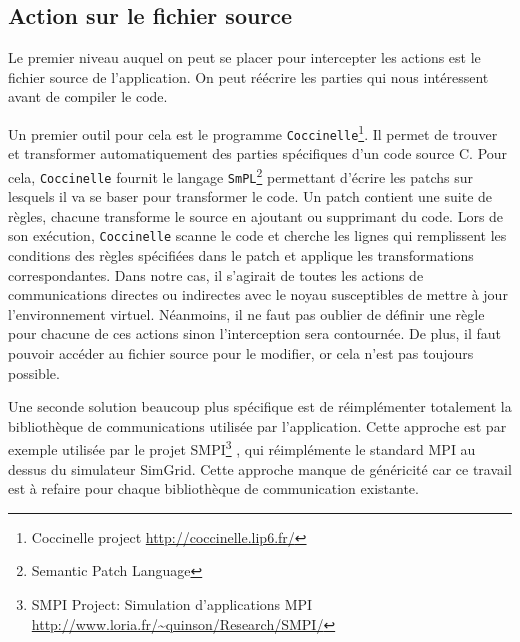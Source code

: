 \subsection{Action sur le fichier source}
\label{subsection:source}
Le premier niveau auquel on peut se placer pour intercepter les actions est le fichier source de l'application. On peut réécrire les parties qui nous intéressent avant de compiler le code.

Un premier outil pour cela est le programme \texttt{Coccinelle}\footnote{Coccinelle project \url{http://coccinelle.lip6.fr/}}. Il permet de trouver et transformer automatiquement des parties spécifiques d'un code source C. Pour cela, \texttt{Coccinelle} fournit le langage \texttt{SmPL}\footnote{Semantic Patch Language} permettant d'écrire les patchs sur lesquels il va se baser pour transformer le code. Un patch contient une suite de règles, chacune transforme le source en ajoutant ou supprimant du code. Lors de son exécution, \texttt{Coccinelle} scanne le code et cherche les lignes qui remplissent les conditions des règles spécifiées dans le patch et applique les transformations correspondantes. Dans notre cas, il s'agirait de toutes les actions de communications directes ou indirectes avec le noyau susceptibles de mettre à jour l'environnement virtuel. Néanmoins, il ne faut pas oublier de définir une règle pour chacune de ces actions sinon l'interception sera contournée. De plus, il faut pouvoir accéder au fichier source pour le modifier, or cela n'est pas toujours possible.

Une seconde solution beaucoup plus spécifique est de réimplémenter totalement la bibliothèque de communications utilisée par l'application. Cette approche est par exemple utilisée par le projet SMPI\footnote{SMPI Project: Simulation d'applications MPI \\ \url{http://www.loria.fr/~quinson/Research/SMPI/}} \citep{clauss2011single}, qui réimplémente le standard MPI au dessus du simulateur SimGrid. Cette approche manque de  généricité car ce travail est à refaire pour chaque bibliothèque de communication existante. 

